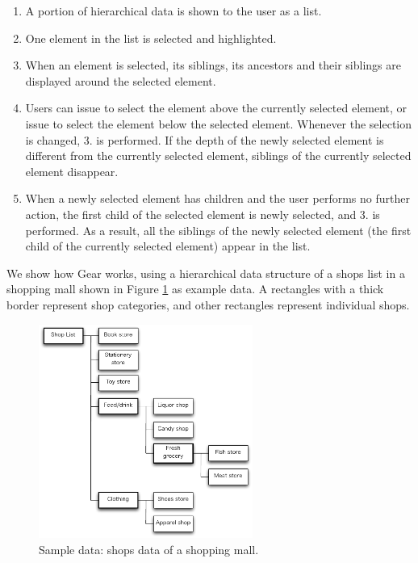 \documentclass[conference]{IEEEtran}
\def\up{\tsf{▲}}
\def\down{\tsf{▼}}
\begin{document}
\begin{enumerate}
\item A portion of hierarchical data is shown to the user as a list.

\item One element in the list is selected and highlighted.


\item When an element is selected, its siblings, its ancestors and their siblings are displayed
around the selected element.

\item Users can issue {\up} to select the element above the currently selected element,
or issue {\down} to select the element below the selected element.
Whenever the selection is changed, 3. is performed.
If the depth of the newly selected element is different from the currently
selected element, siblings of the currently selected element disappear.

\item When a newly selected element has children and the user performs no further action,
the first child of the selected element is newly selected, and 3. is performed.
As a result, all the siblings of the newly selected element
(the first child of the currently selected element) appear in the list.

\end{enumerate}

We show how Gear works, using a hierarchical data structure of
a shops list in a shopping mall shown in Figure \ref{fig1} as example data.
A rectangles with a thick border represent shop categories, and
other rectangles represent individual shops.

\begin{figure}[H]
\centerline{\includegraphics[width=70mm,bb=0 0 490 490]{figures/fig1.pdf}}
\caption{Sample data: shops data of a shopping mall.}
\label{fig1}
\end{figure}
\end{document}

